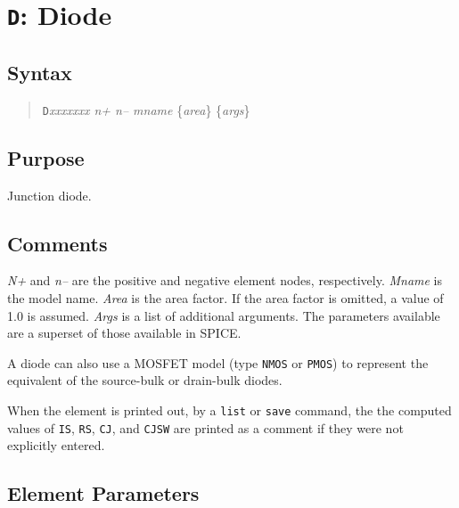 \section{{\tt D}: Diode}
\subsection{Syntax}
\begin{verse}
{\tt D}{\it xxxxxxx n+ n-- mname} \{{\it area}\} \{{\it args}\}
\end{verse}
\subsection{Purpose}

Junction diode.
\subsection{Comments}

{\it N+} and {\it n--} are the positive and negative element nodes,
respectively.  {\it Mname} is the model name.  {\it Area} is the area
factor.  If the area factor is omitted, a value of 1.0 is assumed.  {\it
Args} is a list of additional arguments.  The parameters available are a
superset of those available in SPICE.

A diode can also use a MOSFET model (type {\tt NMOS} or {\tt PMOS})
to represent the equivalent of the source-bulk or drain-bulk diodes.

When the element is printed out, by a {\tt list} or {\tt save} command, the
the computed values of {\tt IS}, {\tt RS}, {\tt CJ}, and {\tt CJSW} are
printed as a comment if they were not explicitly entered.
\subsection{Element Parameters}

